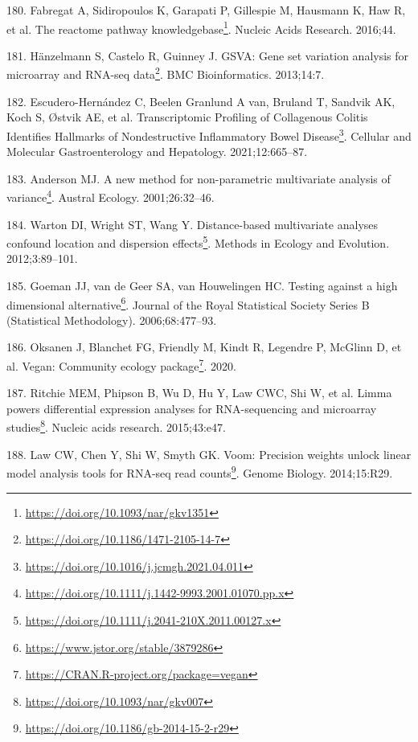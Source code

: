 \documentclass[
  12pt,
  a4paper,
  twoside,
  openright]{book}
\DeclareRobustCommand{\href}[2]{#2\footnote{\url{#1}}}
\newlength{\cslhangindent}
\newlength{\cslentryspacingunit} %
\newenvironment{CSLReferences}[2] %
 {%
  \setlength{\parindent}{0pt}
  \ifodd #1
  \let\oldpar\par
  \def\par{\hangindent=\cslhangindent\oldpar}
  \fi
  \setlength{\parskip}{#2\cslentryspacingunit}
 }%
 {}
\begin{document}
\begin{CSLReferences}{0}{0}
\leavevmode{}%
180. Fabregat A, Sidiropoulos K, Garapati P, Gillespie M, Hausmann K, Haw R, et al. \href{https://doi.org/10.1093/nar/gkv1351}{The reactome pathway knowledgebase}. Nucleic Acids Research. 2016;44.

\leavevmode{}%
181. Hänzelmann S, Castelo R, Guinney J. \href{https://doi.org/10.1186/1471-2105-14-7}{GSVA: Gene set variation analysis for microarray and RNA-seq data}. BMC Bioinformatics. 2013;14:7.

\leavevmode{}%
182. Escudero-Hernández C, Beelen Granlund A van, Bruland T, Sandvik AK, Koch S, Østvik AE, et al. \href{https://doi.org/10.1016/j.jcmgh.2021.04.011}{Transcriptomic Profiling of Collagenous Colitis Identifies Hallmarks of Nondestructive Inflammatory Bowel Disease}. Cellular and Molecular Gastroenterology and Hepatology. 2021;12:665--87.

\leavevmode{}%
183. Anderson MJ. \href{https://doi.org/10.1111/j.1442-9993.2001.01070.pp.x}{A new method for non-parametric multivariate analysis of variance}. Austral Ecology. 2001;26:32--46.

\leavevmode{}%
184. Warton DI, Wright ST, Wang Y. \href{https://doi.org/10.1111/j.2041-210X.2011.00127.x}{Distance-based multivariate analyses confound location and dispersion effects}. Methods in Ecology and Evolution. 2012;3:89--101.

\leavevmode{}%
185. Goeman JJ, van de Geer SA, van Houwelingen HC. \href{https://www.jstor.org/stable/3879286}{Testing against a high dimensional alternative}. Journal of the Royal Statistical Society Series B (Statistical Methodology). 2006;68:477--93.

\leavevmode{}%
186. Oksanen J, Blanchet FG, Friendly M, Kindt R, Legendre P, McGlinn D, et al. \href{https://CRAN.R-project.org/package=vegan}{Vegan: Community ecology package}. 2020.

\leavevmode{}%
187. Ritchie MEM, Phipson B, Wu D, Hu Y, Law CWC, Shi W, et al. \href{https://doi.org/10.1093/nar/gkv007}{Limma powers differential expression analyses for RNA-sequencing and microarray studies}. Nucleic acids research. 2015;43:e47.

\leavevmode{}%
188. Law CW, Chen Y, Shi W, Smyth GK. \href{https://doi.org/10.1186/gb-2014-15-2-r29}{Voom: Precision weights unlock linear model analysis tools for RNA-seq read counts}. Genome Biology. 2014;15:R29.


\end{CSLReferences}
\end{document}
